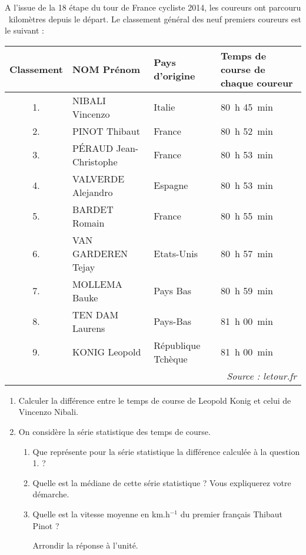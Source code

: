 
\medskip

A l'issue de la 18 étape du tour de France cycliste 2014, les coureurs ont parcouru
~kilomètres depuis le départ. Le classement général des neuf premiers coureurs est
le suivant :

\begin{center}
\begin{tabularx}{\linewidth}{|c|*{3}{X|}}\hline
Classement	& NOM Prénom		& Pays d'origine	&Temps de course de chaque coureur\\ \hline
1.			& NIBALI Vincenzo	& Italie 			&80~h 45~min\\ \hline
2.			& PINOT Thibaut		& France 			&80~h 52~min\\ \hline
3.			& PÉRAUD Jean-Christophe& France		&80~h 53~min\\ \hline
4.			& VALVERDE Alejandro& Espagne 			&80~h 53~min\\ \hline
5.			& BARDET Romain		& France 			&80~h 55~min\\ \hline
6.			& VAN GARDEREN Tejay& Etats-Unis		&80~h 57~min\\ \hline
7.			& MOLLEMA Bauke		& Pays Bas 			&80~h 59~min\\ \hline
8.			& TEN DAM Laurens	& Pays-Bas 			&81~h 00~min\\ \hline
9.			& KONIG Leopold		& République Tchèque&81~h 00~min\\ \hline
\multicolumn{4}{r}{\emph{Source : letour.fr}}\\
\end{tabularx}
\end{center}

\medskip

\begin{enumerate}
\item Calculer la différence entre le temps de course de Leopold Konig et celui de
Vincenzo Nibali.
\item On considère la série statistique des temps de course.
	\begin{enumerate}
		\item Que représente pour la série statistique la différence calculée à la
question 1. ?
		\item Quelle est la médiane de cette série statistique ? Vous expliquerez votre
démarche.
		\item Quelle est la vitesse moyenne en km.h$^{-1}$ du premier français Thibaut Pinot ?
		
Arrondir la réponse à l'unité.
	\end{enumerate}
\end{enumerate}

\vspace{0,5cm}

